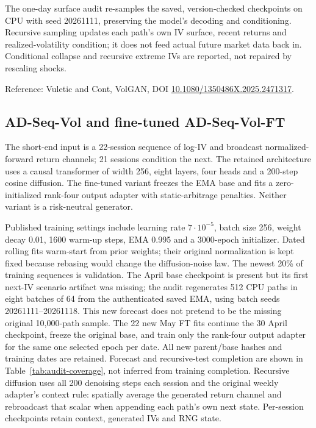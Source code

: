\documentclass[11pt]{article}
\begin{document}
The one-day surface audit re-samples the saved, version-checked checkpoints on CPU with seed 20261111, preserving the model's decoding and conditioning. Recursive sampling updates each path's own IV surface, recent returns and realized-volatility condition; it does not feed actual future market data back in. Conditional collapse and recursive extreme IVs are reported, not repaired by rescaling shocks.

Reference: Vuletic and Cont, VolGAN, DOI \href{https://doi.org/10.1080/1350486X.2025.2471317}{10.1080/1350486X.2025.2471317}.

\subsection{AD-Seq-Vol and fine-tuned AD-Seq-Vol-FT}

The short-end input is a 22-session sequence of log-IV and broadcast normalized-forward return channels; 21 sessions condition the next. The retained architecture uses a causal transformer of width 256, eight layers, four heads and a 200-step cosine diffusion. The fine-tuned variant freezes the EMA base and fits a zero-initialized rank-four output adapter with static-arbitrage penalties. Neither variant is a risk-neutral generator.

Published training settings include learning rate $7\cdot10^{-5}$, batch size 256, weight decay 0.01, 1600 warm-up steps, EMA 0.995 and a 3000-epoch initializer. Dated rolling fits warm-start from prior weights; their original normalization is kept fixed because rebasing would change the diffusion-noise law. The newest 20\% of training sequences is validation. The April base checkpoint is present but its first next-IV scenario artifact was missing; the audit regenerates 512 CPU paths in eight batches of 64 from the authenticated saved EMA, using batch seeds 20261111--20261118. This new forecast does not pretend to be the missing original 10,000-path sample. The 22 new May FT fits continue the 30 April checkpoint, freeze the original base, and train only the rank-four output adapter for the same one selected epoch per date. All new parent/base hashes and training dates are retained. Forecast and recursive-test completion are shown in Table~\ref{tab:audit-coverage}, not inferred from training completion. Recursive diffusion uses all 200 denoising steps each session and the original weekly adapter's context rule: spatially average the generated return channel and rebroadcast that scalar when appending each path's own next state. Per-session checkpoints retain context, generated IVs and RNG state.
\end{document}
